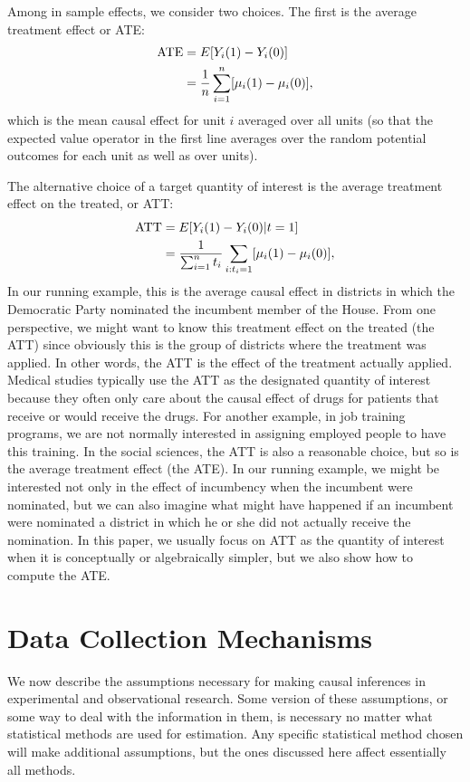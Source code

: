 \documentclass[11pt,titlepage]{article}
\begin{document}
Among in sample effects, we consider two choices.  The first is the
average treatment effect or ATE:
\begin{align}
  \label{pate}
  \text{ATE} & = E[Y_i(1) - Y_i(0)] \notag\\
  &  = \frac{1}{n}\sum_{i=1}^n[\mu_i(1) - \mu_i(0)],
\end{align}
which is the mean causal effect for unit $i$ averaged over all units
(so that the expected value operator in the first line averages over
the random potential outcomes for each unit as well as over units).

The alternative choice of a target quantity of interest is the average
treatment effect on the treated, or ATT:
\begin{align}
  \label{att}
  \text{ATT} & = E[Y_i(1) - Y_i(0)|t=1] \notag\\
  & = \frac{1}{\sum_{i=1}^n t_i}\sum_{i:t_i=1}[\mu_i(1) - \mu_i(0)],
\end{align}
In our running example, this is the average causal effect in districts
in which the Democratic Party nominated the incumbent member of the
House.  From one perspective, we might want to know this treatment
effect on the treated (the ATT) since obviously this is the group of
districts where the treatment was applied.  In other words, the ATT is
the effect of the treatment actually applied.  Medical studies
typically use the ATT as the designated quantity of interest because
they often only care about the causal effect of drugs for patients
that receive or would receive the drugs.  For another example, in job
training programs, we are not normally interested in assigning
employed people to have this training.  In the social sciences, the
ATT is also a reasonable choice, but so is the average treatment
effect (the ATE).  In our running example, we might be interested not
only in the effect of incumbency when the incumbent were nominated,
but we can also imagine what might have happened if an incumbent were
nominated a district in which he or she did not actually receive the
nomination.  In this paper, we usually focus on ATT as the quantity of
interest when it is conceptually or algebraically simpler, but we also
show how to compute the ATE.

\section{Data Collection Mechanisms}

We now describe the assumptions necessary for making causal inferences
in experimental and observational research.  Some version of these
assumptions, or some way to deal with the information in them, is
necessary no matter what statistical methods are used for estimation.
Any specific statistical method chosen will make additional
assumptions, but the ones discussed here affect essentially all
methods.
\end{document}
